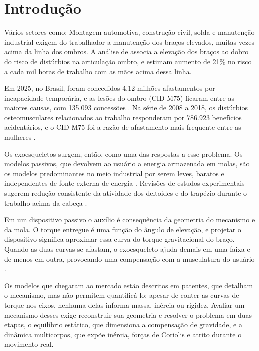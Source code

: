 
\chapter{Introdução}\label{sec:1}

Vários setores como: Montagem automotiva, construção civil, solda e manutenção industrial exigem do trabalhador a manutenção dos braços elevados, muitas vezes acima da linha dos ombros. A análise de \textcite{vandermolen2017} associa a elevação dos braços ao dobro do risco de distúrbios na articulação ombro, e \textcite{seidler2020} estimam aumento de 21\% no risco a cada mil horas de trabalho com as mãos acima dessa linha.

Em 2025, no Brasil, foram concedidos 4,12 milhões afastamentos por incapacidade temporária, e as lesões do ombro (CID M75) ficaram entre as maiores causas, com 135.093 concessões \cite{agenciabrasil2026}. Na série de 2008 a 2018, os distúrbios osteomusculares relacionados ao trabalho responderam por 786.923 benefícios acidentários, e o CID M75 foi a razão de afastamento mais frequente entre as mulheres \cite{manoel2025}.

Os exoesqueletos surgem, então, como uma das respostas a esse problema. Os modelos passivos, que devolvem ao usuário a energia armazenada em molas, são os modelos predominantes no meio industrial por serem leves, baratos e independentes de fonte externa de energia \cite{delooze2016,reyes2023}. Revisões de estudos experimentais sugerem redução consistente da atividade dos deltoides e do trapézio durante o trabalho acima da cabeça \cite{bar2021,moeller2022}.

Em um dispositivo passivo o auxílio é consequência da geometria do mecanismo e da mola. O torque entregue é uma função do ângulo de elevação, e projetar o dispositivo significa aproximar essa curva do torque gravitacional do braço. Quando as duas curvas se afastam, o exoesqueleto ajuda demais em uma faixa e de menos em outra, provocando uma compensação com a musculatura do usuário \cite{nasr2022}.

Os modelos que chegaram ao mercado estão descritos em patentes, que detalham o mecanismo, mas não permitem quantificá-lo: apesar de conter as curvas de torque nos eixos, nenhuma delas informa massa, inércia ou rigidez. Avaliar um mecanismo desses exige reconstruir sua geometria e resolver o problema em duas etapas, o equilíbrio estático, que dimensiona a compensação de gravidade, e a dinâmica multicorpos, que expõe inércia, forças de Coriolis e atrito durante o movimento real.

